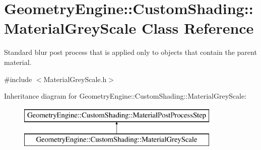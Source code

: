 \hypertarget{class_geometry_engine_1_1_custom_shading_1_1_material_grey_scale}{}\section{Geometry\+Engine\+::Custom\+Shading\+::Material\+Grey\+Scale Class Reference}
\label{class_geometry_engine_1_1_custom_shading_1_1_material_grey_scale}


Standard blur post process that is applied only to objects that contain the parent material.  




{\ttfamily \#include $<$Material\+Grey\+Scale.\+h$>$}

Inheritance diagram for Geometry\+Engine\+::Custom\+Shading\+::Material\+Grey\+Scale\+:\begin{figure}[H]
\begin{center}
\leavevmode
\includegraphics[height=2.000000cm]{class_geometry_engine_1_1_custom_shading_1_1_material_grey_scale}
\end{center}
\end{figure}
